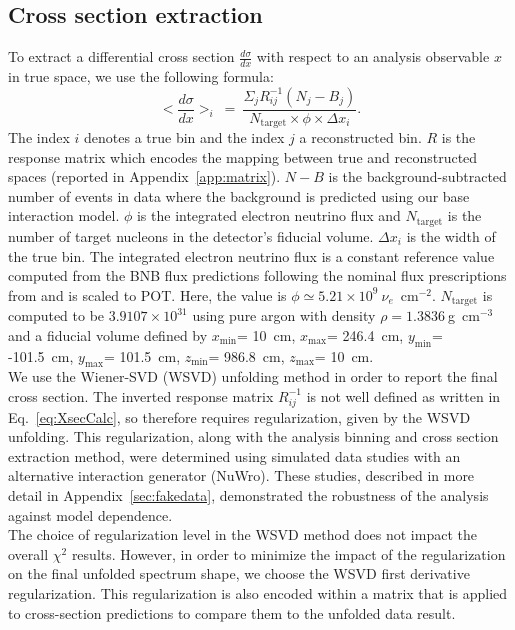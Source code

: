 \documentclass[amsmath,amssymb,aps,prd,showpacs,twocolumn,superscriptaddress,letterpaper,longbibliography, floatfix]{revtex4-2}
\begin{document}
\subsection{Cross section extraction}
\label{sec:unfold}
To extract a differential cross section $\frac{d\sigma}{dx}$ with respect to an analysis observable $x$ in true space, we use the following formula:
\begin{equation}
\label{eq:XsecCalc}
<\frac{d\sigma}{dx}>_i~=~\frac{\Sigma_j R_{ij}^{-1}(N_j-B_j)}{N_{\text{target}}\times \phi \times \Delta x_i} .
\end{equation}
The index $i$ denotes a true bin and the index $j$ a reconstructed bin.
$R$ is the response matrix which encodes the mapping between true and reconstructed spaces (reported in Appendix~\ref{app:matrix}). $N-B$ is the background-subtracted number of events in data where the background is predicted using our base interaction model. $\phi$ is the integrated electron neutrino flux and $N_{\text{target}}$ is the number of target nucleons in the detector's fiducial volume. $\Delta x_i$ is the width of the true bin. The integrated electron neutrino flux is a constant reference value computed from the BNB flux predictions \cite{MiniBooNEFlux} following the nominal flux prescriptions from \cite{FluxPresc} and is scaled to POT. Here, the value is $\phi \simeq 5.21\times 10^9~\nu_e$~cm$^{-2}$. $N_{\text{target}}$ is computed to be $3.9107\times 10^{31}$ using pure argon with density $\rho = 1.3836 ~$g~cm$^{-3}$ and a fiducial volume defined by $x_{\text{min}}$= 10~cm, $x_{\text{max}}$= 246.4~cm, $y_{\text{min}}$= -101.5~cm, $y_{\text{max}}$= 101.5~cm, $z_{\text{min}}$= 986.8~cm, $z_{\text{max}}$= 10~cm. 
\\

We use the Wiener-SVD (WSVD) unfolding method \cite{WienerSVD} in order to report the final cross section.  The inverted response matrix $R_{ij}^{-1}$ is not well defined as written in Eq.~\ref{eq:XsecCalc}, so therefore requires regularization, given by the WSVD unfolding.  This regularization, along with the analysis binning and cross section extraction method, were determined using simulated data studies with an alternative interaction generator (NuWro).  These studies, described in more detail in Appendix~\ref{sec:fakedata}, demonstrated the robustness of the analysis against model dependence. \\    
The choice of regularization level in the WSVD method does not impact the overall $\chi^2$ results. However, in order to minimize the impact of the regularization on the final unfolded spectrum shape, we choose the WSVD first derivative regularization. This regularization is also encoded within a matrix that is applied to cross-section predictions to compare them to the unfolded data result.
\end{document}
